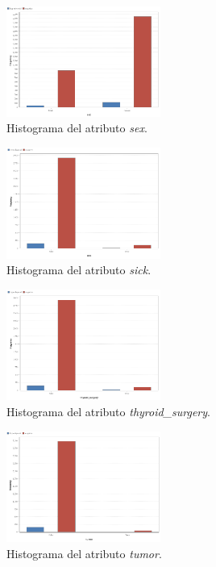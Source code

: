 \documentclass[osajnl,twocolumn,showpacs,superscriptaddress,10pt,floatfix]{revtex4-1} %
\begin{document}
\begin{figure}[H]
    \centering
    \includegraphics[width=0.45\textwidth]{analysis/histogram_sex}
    \caption{Histograma del atributo \textit{sex}.}
    \label{figure:sex}
\end{figure}

\begin{figure}[H]
    \centering
    \includegraphics[width=0.45\textwidth]{analysis/histogram_sick}
    \caption{Histograma del atributo \textit{sick}.}
    \label{figure:sick}
\end{figure}

\begin{figure}[H]
    \centering
    \includegraphics[width=0.45\textwidth]{analysis/histogram_thyroid_surgery}
    \caption{Histograma del atributo \textit{thyroid\_surgery}.}
    \label{figure:thyroid_surgery}
\end{figure}

\begin{figure}[H]
    \centering
    \includegraphics[width=0.45\textwidth]{analysis/histogram_tumor}
    \caption{Histograma del atributo \textit{tumor}.}
    \label{figure:tumor}
\end{figure}
\end{document}
